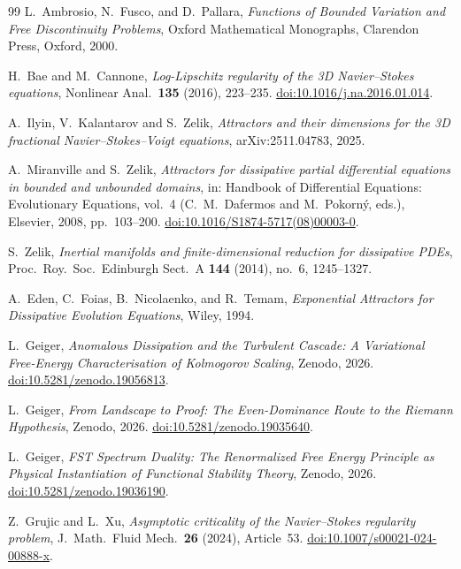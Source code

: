 \documentclass[12pt,a4paper]{article}
\theoremstyle{definition}
\theoremstyle{plain}
\theoremstyle{remark}
\begin{document}
\begin{thebibliography}{99}
L.~Ambrosio, N.~Fusco, and D.~Pallara,
\emph{Functions of Bounded Variation and Free Discontinuity Problems},
Oxford Mathematical Monographs, Clarendon Press, Oxford, 2000.

H.~Bae and M.~Cannone,
\emph{Log-Lipschitz regularity of the 3D Navier--Stokes equations},
Nonlinear Anal.\ \textbf{135} (2016), 223--235.
\href{https://doi.org/10.1016/j.na.2016.01.014}{doi:10.1016/j.na.2016.01.014}.

A.~Ilyin, V.~Kalantarov and S.~Zelik,
\emph{Attractors and their dimensions for the 3D fractional
Navier--Stokes--Voigt equations},
arXiv:2511.04783, 2025.

A.~Miranville and S.~Zelik,
\emph{Attractors for dissipative partial differential equations in bounded and unbounded domains},
in: Handbook of Differential Equations: Evolutionary Equations, vol.~4 (C.~M.~Dafermos and M.~Pokorn\'y, eds.), Elsevier, 2008, pp.~103--200.
\href{https://doi.org/10.1016/S1874-5717(08)00003-0}{doi:10.1016/S1874-5717(08)00003-0}.

S.~Zelik,
\emph{Inertial manifolds and finite-dimensional reduction for
dissipative PDEs},
Proc.\ Roy.\ Soc.\ Edinburgh Sect.~A \textbf{144} (2014), no.~6,
1245--1327.

A.~Eden, C.~Foias, B.~Nicolaenko, and R.~Temam,
\emph{Exponential Attractors for Dissipative Evolution Equations},
Wiley, 1994.

L.~Geiger, \emph{Anomalous Dissipation and the Turbulent Cascade:
A Variational Free-Energy Characterisation of Kolmogorov Scaling},
Zenodo, 2026.
\href{https://doi.org/10.5281/zenodo.19056813}{doi:10.5281/zenodo.19056813}.

L.~Geiger, \emph{From Landscape to Proof: The Even-Dominance Route to the Riemann Hypothesis},
Zenodo, 2026.
\href{https://doi.org/10.5281/zenodo.19035640}{doi:10.5281/zenodo.19035640}.

L.~Geiger, \emph{FST Spectrum Duality: The Renormalized Free Energy Principle as Physical Instantiation of Functional Stability Theory},
Zenodo, 2026.
\href{https://doi.org/10.5281/zenodo.19036190}{doi:10.5281/zenodo.19036190}.

Z.~Grujic and L.~Xu,
\emph{Asymptotic criticality of the Navier--Stokes regularity problem},
J.~Math.\ Fluid Mech.\ \textbf{26} (2024), Article~53.
\href{https://doi.org/10.1007/s00021-024-00888-x}{doi:10.1007/s00021-024-00888-x}.


\end{thebibliography}
\end{document}
